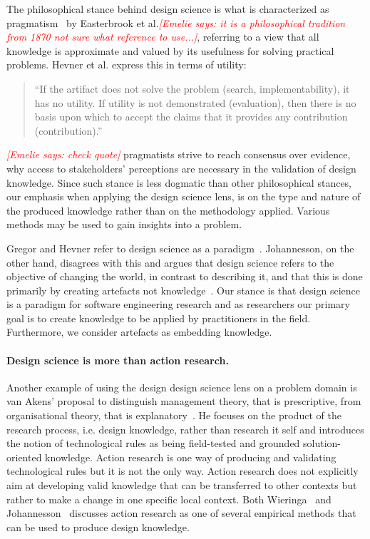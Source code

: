 \documentclass[graybox]{svmult}
\newcommand{\emelie}[1]{\textcolor{red}{{\it [Emelie says: #1]}}}
\newcommand{\emelie}[1]{}
\begin{document}
The philosophical stance behind design science is what is characterized as pragmatism~\cite{easterbrook_selecting_2008} by Easterbrook et al.\emelie{it is a philosophical tradition from 1870 not sure what reference to use...}, referring to a view that all knowledge is approximate and valued by its usefulness for solving practical problems. Hevner et al. express this in terms of utility: \begin{quote}
	``If the artifact does not solve the problem (search, implementability), it has no utility. If utility is not demonstrated (evaluation), then there is no basis upon which to accept the claims that it provides any contribution (contribution).''~\cite{hevner_design_2004}
\end{quote}\emelie{check quote} pragmatists strive to reach consensus over evidence, why access to stakeholders' perceptions are necessary in the validation of design knowledge. Since such stance is less dogmatic than other philosophical stances, our emphasis when applying the design science lens, is on the type and nature of the produced knowledge rather than on the methodology applied. Various methods may be used to gain insights into a problem.

Gregor and Hevner refer to design science as a paradigm~\cite{gregor_positioning_2013}. Johannesson, on the other hand, disagrees with this and argues that design science refers to the objective of changing the world, in contrast to describing it, and that this is done primarily by creating artefacts not knowledge~\cite{johannesson_introduction_2014}. Our stance is that design science is a paradigm for software engineering research and as researchers our primary goal is to create knowledge to be applied by practitioners in the field. Furthermore, we consider artefacts as embedding knowledge. 


\paragraph{Design science is more than action research.}

Another example of using the design design science lens on a problem domain is van Akens' proposal to distinguish management theory, that is prescriptive, from organisational theory, that is explanatory~\cite{van_aken_management_2005}. He focuses on the product of the research process, i.e. design knowledge, rather than research it self and introduces the notion of technological rules as being field-tested and grounded solution-oriented knowledge. Action research is one way of producing and validating technological rules but it is not the only way. Action research does not explicitly aim at developing valid knowledge that can be transferred to other contexts but rather to make a change in one specific local context. Both Wieringa~\cite{wieringa_technical_2012} and Johannesson~\cite{johannesson_introduction_2014} discusses action research as one of several empirical methods that can be used to produce design knowledge.
\end{document}
